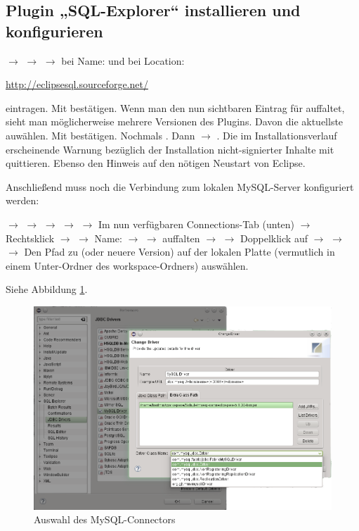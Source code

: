 \subsection{Plugin „SQL-Explorer“ installieren und konfigurieren}

 $\rightarrow$  $\rightarrow$
 $\rightarrow$ bei Name:  und bei Location:

\url{http://eclipsesql.sourceforge.net/} 

eintragen. Mit  bestätigen. Wenn man den nun sichtbaren Eintrag für
 auffaltet, sieht man möglicherweise mehrere Versionen des
Plugins. Davon die aktuellste auwählen. Mit  bestätigen. Nochmals
. Dann 
$\rightarrow$ . Die im Installationsverlauf erscheinende Warnung
bezüglich der Installation nicht-signierter Inhalte mit  quittieren.
Ebenso den Hinweis auf den nötigen Neustart von Eclipse.

Anschließend muss noch die Verbindung zum lokalen MySQL-Server konfiguriert
werden:

 $\rightarrow$  $\rightarrow$  $\rightarrow$  $\rightarrow$ 
$\rightarrow$  Im nun verfügbaren Connections-Tab (unten)
$\rightarrow$ Rechtsklick $\rightarrow$ 
$\rightarrow$ Name:  $\rightarrow$  $\rightarrow$  auffalten $\rightarrow$  $\rightarrow$ Doppelklick auf   $\rightarrow$
 $\rightarrow$  $\rightarrow$
Den Pfad zu  (oder neuere Version)
auf der lokalen Platte (vermutlich in einem Unter-Ordner des workspace-Ordners)
auswählen.

Siehe Abbildung \ref{fig:mysql-connector}.

\begin{figure}[h]
  \centering
   \includegraphics[width=1.0\textwidth]{./inf/SEKII/01_Vorbereitung/MySQL-Driver.png}
   \caption{Auswahl des MySQL-Connectors}
   \label{fig:mysql-connector}
\end{figure}

